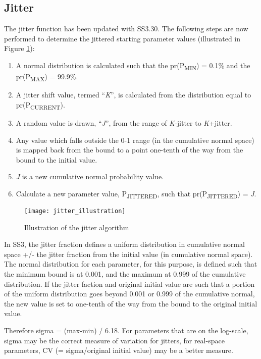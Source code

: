 \subsection{Jitter}
\hypertarget{Jitter}{}
The jitter function has been updated with SS3.30. The following steps are now performed to determine the jittered starting parameter values (illustrated in Figure \ref{fig:jitter}):
\begin{enumerate}
	\item A normal distribution is calculated such that the pr(P\textsubscript{MIN}) = 0.1\% and the pr(P\textsubscript{MAX}) = 99.9\%.
	\item A jitter shift value, termed ``\textit{K}'', is calculated from the distribution equal to pr(P\textsubscript{CURRENT}).
	\item A random value is drawn, ``\textit{J}'', from the range of \textit{K}-jitter to \textit{K}+jitter.
	\item Any value which falls outside the 0-1 range (in the cumulative normal space) is mapped back from the bound to a point one-tenth of the way from the bound to the initial value.
	\item \textit{J} is a new cumulative normal probability value.
	\item Calculate a new parameter value, P\textsubscript{JITTERED}, such that pr(P\textsubscript{JITTERED}) = \textit{J}.
\end{enumerate}

\begin{figure}[ht]
	\begin{center}
		\texttt{[image: jitter\_illustration]}\\
		\caption{Illustration of the jitter algorithm}
		\label{fig:jitter}
	\end{center}
\end{figure}

In SS3, the jitter fraction defines a uniform distribution in cumulative normal space +/- the jitter fraction from the initial value (in cumulative normal space). The normal distribution for each parameter, for this purpose, is defined such that the minimum bound is at 0.001, and the maximum at 0.999 of the cumulative distribution. If the jitter faction and original initial value are such that a portion of the uniform distribution goes beyond 0.001 or 0.999 of the cumulative normal, the new value is set to one-tenth of the way from the bound to the original initial value. 

Therefore sigma = (max-min) / 6.18. For parameters that are on the log-scale, sigma may be the correct measure of variation for jitters, for real-space parameters, CV (= sigma/original initial value) may be a better measure. 

